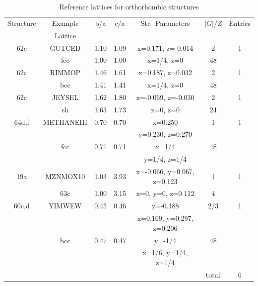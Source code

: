 \documentclass[preprint]{iucr}              %
\begin{document}
\begin{table}
\caption{Reference lattices for orthorhombic structures}
\label{orth}
\begin{center}
\begin{tabular}{ccccccc}%
\cline{1-7}
Structure & Example & b/a & c/a & Str.\ Parameters & $|G|/Z$ & Entries \\
          & Lattice \\
\cline{1-7}
62c     & GUTCED    & 1.10  & 1.09  & x=0.171, z=-0.014   & 2  & 1 \\
        & fcc       & 1.00  & 1.00  & x=1/4, z=0         & 48 \\
62c     & RIMMOP    & 1.46  & 1.61  & x=0.187, z=0.032   & 2  & 1 \\
        & bcc       & 1.41  & 1.41  & x=1/4, z=0         & 48 \\
62c     & JEYSEL    & 1.62  & 1.80  & x=-0.069, z=-0.030   & 2  & 1 \\
        & sh        & 1.63  & 1.73  & x=0, z=0           & 24 \\
64d,f   & METHANEIII& 0.70  & 0.70  & x=0.250            & 1  & 1 \\
        &           &       &       & y=0.230, z=0.270    \\
        & fcc       & 0.71  & 0.71  & x=1/4              & 48 \\
        &           &       &       & y=1/4, z=1/4 \\
19a     & MZNMOX10  & 1.03  & 3.93  & x=-0.066, y=0.067, z=0.123 & 1 & 1 \\
        & 63c       & 1.00  & 3.15  & x=0, y=0, z=0.112          & 4 \\
60c,d   & YIMWEW    & 0.45  & 0.46  & y=-0.188            & 2/3 & 1 \\
        &           &       &       & x=0.169, y=0.297, z=0.206 \\
        & bcc       & 0.47  & 0.47  & y=-1/4              & 48 & \\
        &           &       &       & x=1/6, y=1/4, z=1/4 \\
\cline{7-7}
\multicolumn{6}{r}{total:} & 6 \\
\cline{1-7}
\end{tabular}
\end{center}
\end{table}
\end{document}
